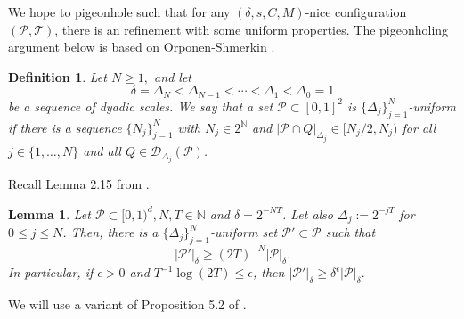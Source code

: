 \documentclass{amsart}
\newtheorem{lemma}[prop]{Lemma}
\newtheorem{definition}[prop]{Definition}
\newcommand{\N}{\mathbb{N}}
\newcommand{\cD}{\mathcal{D}}
\newcommand{\cT}{\mathcal{T}}
\newcommand{\cP}{\mathcal{P}}
\begin{document}
We hope to pigeonhole such that for any $(\delta, s, C, M)$-nice configuration $(\cP, \cT)$, there is an refinement with some uniform properties. The  pigeonholing argument below is based on Orponen-Shmerkin \cite{orponen2021hausdorff}.









\begin{definition}
    Let $N\geq 1, $ and let 
   \[
   \delta=\Delta_N<\Delta_{N-1}<\cdots<\Delta_1<\Delta_0=1
   \]
   be a sequence of dyadic scales. We say that a set $\cP\subset [0,1]^2$ is $\{\Delta_j\}_{j=1}^N$-uniform if there is a sequence $\{N_j\}_{j=1}^N$ with $N_j\in 2^{\mathbb{N}}$ and $|\cP\cap Q|_{\Delta_j}\in [ N_j/2, N_j)$ for all $j\in \{1, \dots, N\}$ and all $Q\in \cD_{\Delta_j}(\cP)$. 
\end{definition}


Recall Lemma 2.15 from \cite{orponen2023projections}.
\begin{lemma}\label{lem: pigeonhole}
    Let $\cP\subset [0,1)^d, N, T\in \mathbb{N}$ and $\delta=2^{-NT}$. Let also $\Delta_j:=2^{-jT}$ for $0\leq j\leq N$. Then, there is a $\{\Delta_j\}_{j=1}^N$-uniform set $\cP'\subset \cP$ such that 
    \[
    |\cP'|_{\delta}\geq (2T)^{-N} |\cP|_{\delta}. 
    \]
    In particular, if $\epsilon>0$ and $T^{-1}\log(2T)\leq \epsilon$, then $|\cP'|_{\delta}\geq \delta^{\epsilon}|\cP|_{\delta}.$
\end{lemma}




We will use a variant of Proposition 5.2 of \cite{orponen2021hausdorff}. %
\end{document}
